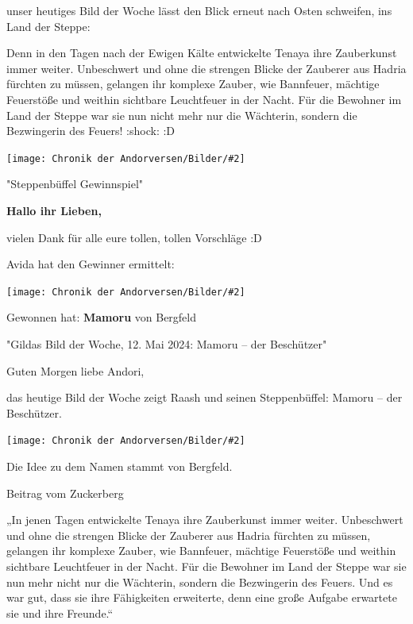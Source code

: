 \documentclass[10pt, a4paper, oneside]{book}
\newcommand{\bildmitts}[2][height=0.32\textwidth,width=0.48\textwidth,keepaspectratio]{%
    \begin{center}
        \texttt{[image: Chronik der Andorversen/Bilder/\#2]}
    \end{center}
}
\begin{document}
\begin{multicols}{2}
unser heutiges Bild der Woche lässt den Blick erneut nach Osten schweifen, ins Land der Steppe:

Denn in den Tagen nach der Ewigen Kälte entwickelte Tenaya ihre Zauberkunst immer weiter. Unbeschwert und ohne die strengen Blicke der Zauberer aus Hadria fürchten zu müssen, gelangen ihr komplexe Zauber, wie Bannfeuer, mächtige Feuerstöße und weithin sichtbare Leuchtfeuer in der Nacht. Für die Bewohner im Land der Steppe war sie nun nicht mehr nur die Wächterin, sondern die Bezwingerin des Feuers! :shock: :D

\bildmitts{Die Bezwingerin des Feuers 5.jpeg}




\begin{center}
    "Steppenbüffel Gewinnspiel"
\end{center}

\textbf{Hallo ihr Lieben,}

vielen Dank für alle eure tollen, tollen Vorschläge :D

Avida hat den Gewinner ermittelt:

\bildmitts{Die Bezwingerin des Feuers 6.jpeg}

Gewonnen hat: \textbf{Mamoru} von Bergfeld





\begin{center}
    "Gildas Bild der Woche, 12. Mai 2024: Mamoru – der Beschützer"
\end{center}

Guten Morgen liebe Andori,

das heutige Bild der Woche zeigt Raash und seinen Steppenbüffel: Mamoru – der Beschützer.

\bildmitts{Die Bezwingerin des Feuers 7.jpeg}

Die Idee zu dem Namen stammt von Bergfeld.








\begin{center}
    Beitrag vom Zuckerberg
\end{center}

„In jenen Tagen entwickelte Tenaya ihre Zauberkunst immer weiter. Unbeschwert und ohne die strengen Blicke der Zauberer aus Hadria fürchten zu müssen, gelangen ihr komplexe Zauber, wie Bannfeuer, mächtige Feuerstöße und weithin sichtbare Leuchtfeuer in der Nacht. Für die Bewohner im Land der Steppe war sie nun mehr nicht nur die Wächterin, sondern die Bezwingerin des Feuers. Und es war gut, dass sie ihre Fähigkeiten erweiterte, denn eine große Aufgabe erwartete sie und ihre Freunde.“



\end{multicols}
\end{document}
